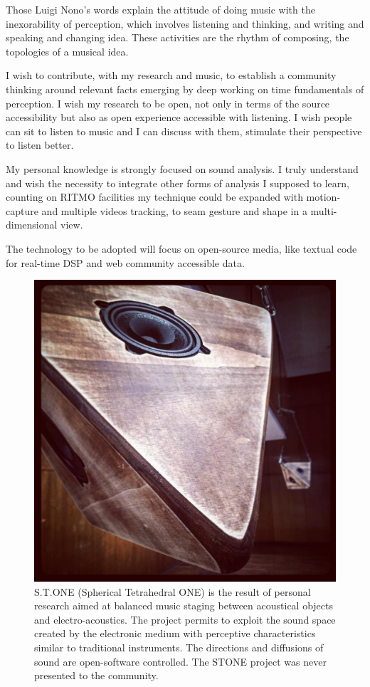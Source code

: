 \documentclass[
	12pt,
	a4paper,
	twocolumn
	]{article}
\begin{document}
Those Luigi Nono's words explain the attitude of doing music with the inexorability of perception, which involves listening and thinking, and writing and speaking and changing idea. These activities are the rhythm of composing, the topologies of a musical idea. 

I wish to contribute, with my research and music, to establish a community thinking around relevant facts emerging by deep working on time fundamentals of perception. I wish my research to be open, not only in terms of the source accessibility but also as open experience accessible with listening. I wish people can sit to listen to music and I can discuss with them, stimulate their perspective to listen better.

My personal knowledge is strongly focused on sound analysis. I truly understand and wish the necessity to integrate other forms of analysis I supposed to learn, counting on RITMO facilities my technique could be expanded with motion-capture and multiple videos tracking, to seam gesture and shape in a multi-dimensional view. 

The technology to be adopted will focus on open-source media, like textual code for real-time DSP and web community accessible data.


\begin{figure}[htbp]
\begin{center}
\includegraphics[width=.47\textwidth]{img/13556748_1807931906092757_1243460980_n.jpg}
\caption{S.T.ONE (Spherical Tetrahedral ONE) is the result of personal research aimed at balanced music staging between acoustical objects and electro-acoustics. The project permits to exploit the sound space created by the electronic medium with perceptive characteristics similar to traditional instruments. The directions and diffusions of sound are open-software controlled. The STONE project was never presented to the community.}
\label{stone2}
\end{center}
\end{figure}
\end{document}
